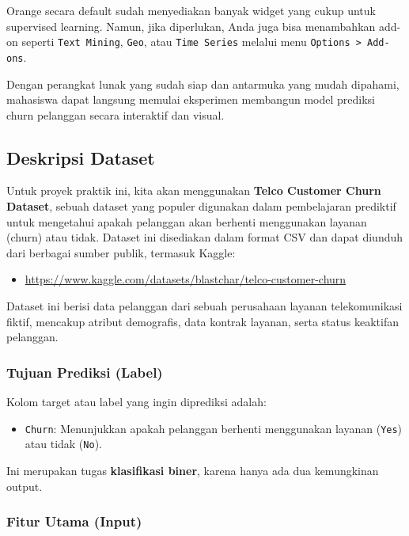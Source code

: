 Orange secara default sudah menyediakan banyak widget yang cukup untuk supervised learning. Namun, jika diperlukan, Anda juga bisa menambahkan add-on seperti \texttt{Text Mining}, \texttt{Geo}, atau \texttt{Time Series} melalui menu \texttt{Options > Add-ons}.

Dengan perangkat lunak yang sudah siap dan antarmuka yang mudah dipahami, mahasiswa dapat langsung memulai eksperimen membangun model prediksi churn pelanggan secara interaktif dan visual.

\subsection{Deskripsi Dataset}

Untuk proyek praktik ini, kita akan menggunakan \textbf{Telco Customer Churn Dataset}, sebuah dataset yang populer digunakan dalam pembelajaran prediktif untuk mengetahui apakah pelanggan akan berhenti menggunakan layanan (churn) atau tidak. Dataset ini disediakan dalam format CSV dan dapat diunduh dari berbagai sumber publik, termasuk Kaggle:

\begin{itemize}
	\item \url{https://www.kaggle.com/datasets/blastchar/telco-customer-churn}
\end{itemize}

Dataset ini berisi data pelanggan dari sebuah perusahaan layanan telekomunikasi fiktif, mencakup atribut demografis, data kontrak layanan, serta status keaktifan pelanggan.

\subsubsection*{Tujuan Prediksi (Label)}

Kolom target atau label yang ingin diprediksi adalah:
\begin{itemize}
	\item \texttt{Churn}: Menunjukkan apakah pelanggan berhenti menggunakan layanan (\texttt{Yes}) atau tidak (\texttt{No}).
\end{itemize}

Ini merupakan tugas \textbf{klasifikasi biner}, karena hanya ada dua kemungkinan output.

\subsubsection*{Fitur Utama (Input)}

